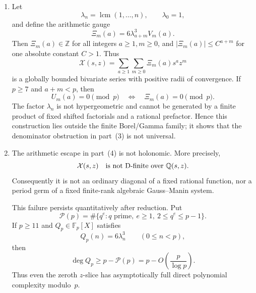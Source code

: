 \begin{proposition}
\begin{enumerate}
\item Let
  \[
   \lambda_n=\operatorname {lcm}(1,\ldots,n),\qquad \lambda_0=1,
  \]
  and define the arithmetic gauge
  \begin{equation}
   \Xi_m(a)=6\lambda_{a+m}^3V_m(a).
   \label{eq:lcm-gap-gauge}
  \end{equation}
  Then $\Xi_m(a)\in\mathbb Z$ for all integers $a\geq1,m\geq0$, and
  $|\Xi_m(a)|\leq C^{a+m}$ for one absolute constant $C>1$.  Thus
  \[
   \mathcal X(s,z)=\sum_{a\geq1}\sum_{m\geq0}\Xi_m(a)s^az^m
  \]
  is a globally bounded bivariate series with positive radii of
  convergence.  If $p\geq7$ and $a+m<p$, then
  \begin{equation}
   U_m(a)=0\pmod p
   \quad\Longleftrightarrow\quad
   \Xi_m(a)=0\pmod p.
   \label{eq:lcm-gap-unit-equivalence}
  \end{equation}
  The factor $\lambda_n$ is not hypergeometric and cannot be generated by
  a finite product of fixed shifted factorials and a rational prefactor.
  Hence this construction lies outside the finite Borel/Gamma family; it
  shows that the denominator obstruction in part~(3) is not universal.

\item The arithmetic escape in part~(4) is not holonomic.  More precisely,
  \[
   \mathcal X(s,z)\quad\hbox{is not D-finite over }\mathbb Q(s,z).
  \]
  Consequently it is not an ordinary diagonal of a fixed rational
  function, nor a period germ of a fixed finite-rank algebraic
  Gauss--Manin system.

  This failure persists quantitatively after reduction.  Put
  \[
   \mathcal P(p)=
   \#\{q^e: q\text{ prime},\ e\geq1,\ 2\leq q^e\leq p-1\}.
  \]
  If \(p\geq11\) and \(Q_p\in\mathbb F_p[X]\) satisfies
  \[
   Q_p(n)=6\lambda_n^3\qquad(0\leq n<p),
  \]
  then
  \begin{equation}
   \deg Q_p\geq p-\mathcal P(p)
   =p-O\!\left(\frac p{\log p}\right).
   \label{eq:lcm-gauge-interpolation-degree}
  \end{equation}
  Thus even the zeroth \(z\)-slice has asymptotically full direct
  polynomial complexity modulo~\(p\).
\end{enumerate}
\end{proposition}

